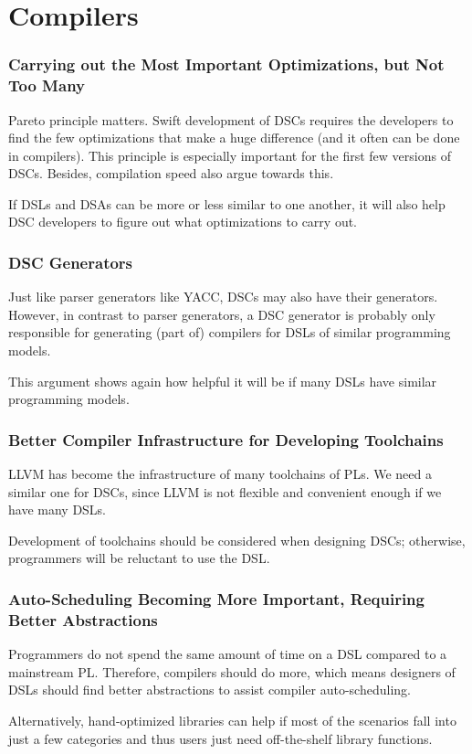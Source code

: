 \documentclass[11pt]{article}
\begin{document}
\section{Compilers}
\subsubsection*{Carrying out the Most Important Optimizations, but Not Too Many}
Pareto principle matters.
Swift development of DSCs requires the developers to find the few optimizations that make a huge difference (and it often can be done in compilers).
This principle is especially important for the first few versions of DSCs.
Besides, compilation speed also argue towards this.

If DSLs and DSAs can be more or less similar to one another, it will also help DSC developers to figure out what optimizations to carry out.
\subsubsection*{DSC Generators}
Just like parser generators like YACC, DSCs may also have their generators.
However, in contrast to parser generators, a DSC generator is probably only responsible for generating (part of) compilers for DSLs of similar programming models.

This argument shows again how helpful it will be if many DSLs have similar programming models.
\subsubsection*{Better Compiler Infrastructure for Developing Toolchains}
LLVM has become the infrastructure of many toolchains of PLs.
We need a similar one for DSCs, since LLVM is not flexible and convenient enough if we have many DSLs.

Development of toolchains should be considered when designing DSCs; otherwise, programmers will be reluctant to use the DSL.

\subsubsection*{Auto-Scheduling Becoming More Important, Requiring Better Abstractions}
Programmers do not spend the same amount of time on a DSL compared to a mainstream PL.
Therefore, compilers should do more, which means designers of DSLs should find better abstractions to assist compiler auto-scheduling.

Alternatively, hand-optimized libraries can help if most of the scenarios fall into just a few categories and thus users just need off-the-shelf library functions.
\end{document}
